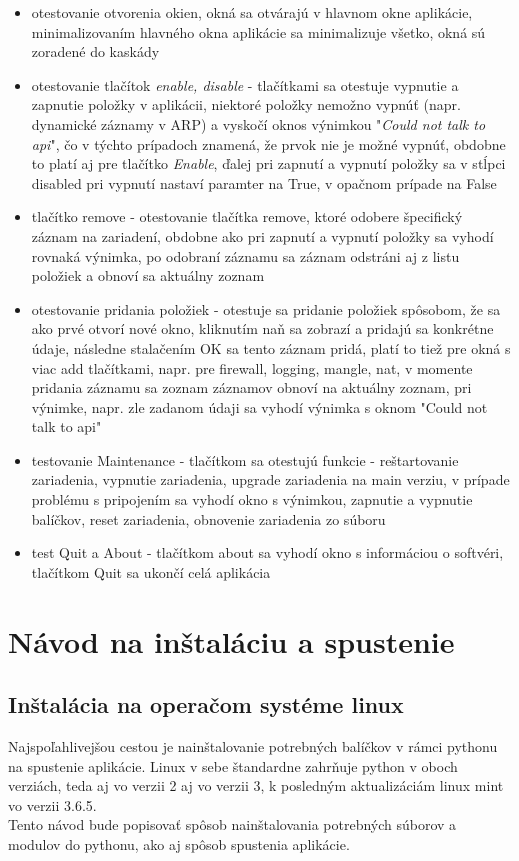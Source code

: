 \begin{itemize}
\item otestovanie otvorenia okien, okná sa otvárajú v hlavnom okne aplikácie, minimalizovaním hlavného okna aplikácie sa minimalizuje všetko, okná sú zoradené do kaskády
\item otestovanie tlačítok \textit{enable, disable} - tlačítkami sa otestuje vypnutie a zapnutie položky v aplikácii, niektoré položky nemožno vypnúť (napr. dynamické záznamy v ARP) a vyskočí oknos výnimkou "\textit{Could not talk to api}", čo v týchto prípadoch znamená, že prvok nie je možné vypnúť, obdobne to platí aj pre tlačítko \textit{Enable}, ďalej pri zapnutí a vypnutí položky sa v stĺpci disabled pri vypnutí nastaví paramter na True, v opačnom prípade na False
\item tlačítko remove - otestovanie tlačítka remove, ktoré odobere špecifický záznam na zariadení, obdobne ako pri zapnutí a vypnutí položky sa vyhodí rovnaká výnimka, po odobraní záznamu sa záznam odstráni aj z listu položiek a obnoví sa aktuálny zoznam 
\item otestovanie pridania položiek - otestuje sa pridanie položiek spôsobom, že sa ako prvé otvorí nové okno, kliknutím naň sa zobrazí  a pridajú sa konkrétne údaje, následne stalačením OK sa tento záznam pridá, platí to tiež pre okná s viac add tlačítkami, napr. pre firewall, logging, mangle, nat, v momente pridania záznamu  sa zoznam záznamov obnoví na aktuálny zoznam, pri výnimke, napr. zle zadanom údaji sa vyhodí výnimka s oknom "Could not talk to api"
\item testovanie Maintenance - tlačítkom sa otestujú funkcie - reštartovanie zariadenia, vypnutie zariadenia, upgrade zariadenia na main verziu, v prípade problému s pripojením sa vyhodí okno s výnimkou, zapnutie a vypnutie balíčkov, reset zariadenia, obnovenie zariadenia zo súboru
\item test Quit a About - tlačítkom about sa vyhodí okno s informáciou o softvéri, tlačítkom Quit sa ukončí celá aplikácia 
\end{itemize}
\chapter{Návod na inštaláciu a spustenie}
\section{Inštalácia na operačom systéme linux}
Najspoľahlivejšou cestou je nainštalovanie potrebných balíčkov v rámci pythonu na spustenie aplikácie. Linux v sebe štandardne zahrňuje python v oboch verziách, teda aj vo verzii 2 aj vo verzii 3, k posledným aktualizáciám linux mint vo verzii 3.6.5. \\
Tento návod bude popisovať spôsob nainštalovania potrebných súborov a modulov do pythonu, ako aj spôsob spustenia aplikácie.
